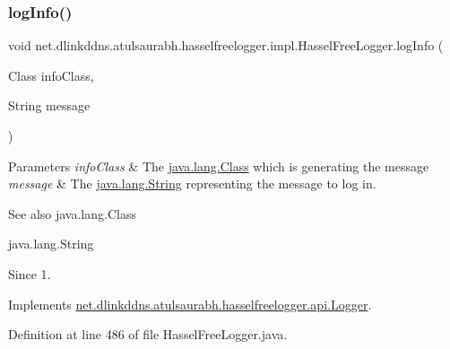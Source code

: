 \subsubsection{\texorpdfstring{log\+Info()}{logInfo()}\hspace{0.1cm}{\footnotesize\ttfamily [2/3]}}
{\footnotesize\ttfamily void net.\+dlinkddns.\+atulsaurabh.\+hasselfreelogger.\+impl.\+Hassel\+Free\+Logger.\+log\+Info (\begin{DoxyParamCaption}\item[{Class}]{info\+Class,  }\item[{String}]{message }\end{DoxyParamCaption})}


\begin{DoxyParams}{Parameters}
{\em info\+Class} & The \mbox{\hyperlink{}{java.\+lang.\+Class}} which is generating the message \\
\hline
{\em message} & The \mbox{\hyperlink{}{java.\+lang.\+String}} representing the message to log in. \\
\hline
\end{DoxyParams}
\begin{DoxySeeAlso}{See also}
java.\+lang.\+Class 

java.\+lang.\+String 
\end{DoxySeeAlso}
\begin{DoxySince}{Since}
1. 
\end{DoxySince}


Implements \mbox{\hyperlink{interfacenet_1_1dlinkddns_1_1atulsaurabh_1_1hasselfreelogger_1_1api_1_1_logger_ac0c7463bc249c77cd33e02b99a77a8d8}{net.\+dlinkddns.\+atulsaurabh.\+hasselfreelogger.\+api.\+Logger}}.



Definition at line 486 of file Hassel\+Free\+Logger.\+java.

\mbox{\label{classnet_1_1dlinkddns_1_1atulsaurabh_1_1hasselfreelogger_1_1impl_1_1_hassel_free_logger_ac0596a92805b29d9402a9eb17c71891a}} 

